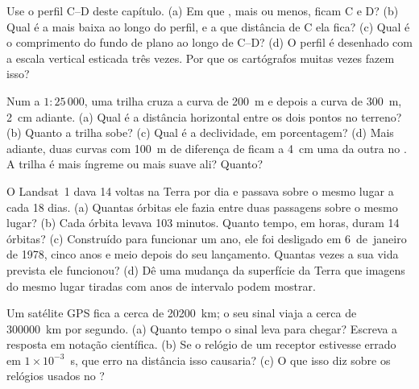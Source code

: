 \begin{exercise}[$\star\star$]\label{exo:g9:maps-of-the-earth:7}
Use o perfil C--D deste capítulo. (a) Em que , mais ou menos,
ficam C e D? (b) Qual é a  mais baixa ao longo do perfil, e a que
distância de C ela fica? (c) Qual é o comprimento do fundo de  plano
ao longo de C--D? (d) O perfil é desenhado com a escala vertical esticada
três vezes. Por que os cartógrafos muitas vezes fazem isso?
\end{exercise}

\begin{exercise}[$\star\star$]\label{exo:g9:maps-of-the-earth:8}
Num  a $1 : 25\,000$, uma trilha cruza a curva de \qty{200}{m} e
depois a curva de \qty{300}{m}, \qty{2}{cm} adiante. (a) Qual é a
distância horizontal entre os dois pontos no terreno? (b) Quanto a trilha
sobe? (c) Qual é a declividade, em porcentagem? (d) Mais adiante, duas
curvas com \qty{100}{m} de diferença de  ficam a \qty{4}{cm} uma
da outra no . A trilha é mais íngreme ou mais suave ali? Quanto?
\end{exercise}

\begin{exercise}[$\star\star$]\label{exo:g9:maps-of-the-earth:9}
O Landsat~1 dava 14 voltas na Terra por dia e passava sobre o mesmo lugar
a cada 18 dias. (a) Quantas órbitas ele fazia entre duas passagens sobre o
mesmo lugar? (b) Cada órbita levava 103 minutos. Quanto tempo, em horas,
duram 14 órbitas? (c) Construído para funcionar um ano, ele foi desligado
em 6~de~janeiro de 1978, cinco anos e meio depois do seu lançamento.
Quantas vezes a sua vida prevista ele funcionou? (d) Dê uma mudança da
superfície da Terra que imagens do mesmo lugar tiradas com anos de
intervalo podem mostrar.
\end{exercise}

\begin{exercise}[$\star\star$]\label{exo:g9:maps-of-the-earth:10}
Um satélite GPS fica a cerca de \qty{20200}{km}; o seu sinal viaja a
cerca de \qty{300000}{km} por segundo. (a) Quanto tempo o sinal leva para
chegar? Escreva a resposta em notação científica. (b) Se o relógio de um
receptor estivesse errado em $1 \times 10^{-3}$~s, que erro na distância
isso causaria? (c) O que isso diz sobre os relógios usados no
?
\end{exercise}

